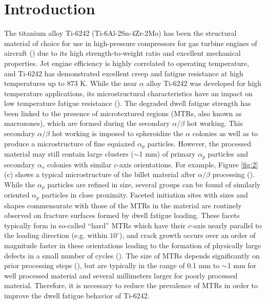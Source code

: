 \documentclass[review]{elsarticle}
\begin{document}
\linenumbers

\section{Introduction}
The titanium alloy Ti-6242 (Ti-6Al-2Sn-4Zr-2Mo) has been the structural material of choice for use in high-pressure compressors for gas turbine engines of aircraft (\cite{r2}) due to its high strength-to-weight ratio and excellent mechanical properties.
Jet engine efficiency is highly correlated to operating temperature, and Ti-6242 has demonstrated excellent creep and fatigue resistance at high temperatures up to 873 K.
While the near $\alpha$ alloy Ti-6242 was developed for high temperature applications, its microstructural characteristics have an impact on low temperature fatigue resistance (\cite{r3}).
The degraded dwell fatigue strength has been linked to the presence of microtextured regions (MTRs, also known as macrozones), which are formed during the secondary $\alpha/\beta$ hot working.
This secondary $\alpha/\beta$ hot working is imposed to spheroidize the $\alpha$ colonies as well as to produce a microstructure of fine equiaxed $\alpha _p$ particles.
However, the processed material may still contain large clusters ($\sim$1 mm) of primary $\alpha_p$ particles and secondary $\alpha_s$ colonies with similar $c$-axis orientations.
For example, Figure \ref{fig:2} (c) shows a typical microstructure of the billet material after $\alpha/\beta$ processing (\cite{r5}).
While the $\alpha _p$ particles are refined in size, several groups can be found of similarly oriented $\alpha _p$ particles in close proximity.
Faceted initiation sites with sizes and shapes commensurate with those of the MTRs in the material are routinely observed on fracture surfaces formed by dwell fatigue loading.
These facets typically form in so-called ``hard'' MTRs which have their $c$-axis nearly parallel to the loading direction (e.g. within $10^{\circ}$), and crack growth occurs over an order of magnitude faster in these orientations leading to the formation of physically large defects in a small number of cycles (\cite{r3,r4}).
The size of MTRs depends significantly on prior processing steps (\cite{r5}), but are typically in the range of 0.1 mm to $\sim$1 mm for well processed material and several millimeters larger for poorly processed material.
Therefore, it is necessary to reduce the prevalence of MTRs in order to improve the dwell fatigue behavior of Ti-6242.
\end{document}
